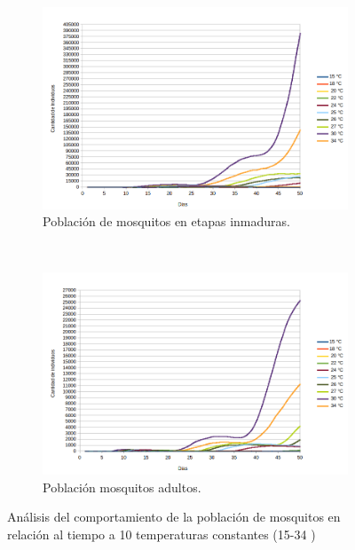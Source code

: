 \begin{figure}[!htpb]
    \centering
    \begin{subfigure}[b]{0.45\textwidth}
        \includegraphics[width=\textwidth]{./graphics/evolucion-poblacion-all.png}
        \caption{ Población de mosquitos en etapas inmaduras.}
    \end{subfigure}
    ~~~~
    \begin{subfigure}[b]{0.45\textwidth}
        \includegraphics[width=\textwidth]{./graphics/evolucion-poblacion-adultos.png}
        \caption{ Población mosquitos adultos.}
    \end{subfigure}

\caption{\label{fig:poblacion-all}Análisis del comportamiento de la población de mosquitos en relación al tiempo a 10 temperaturas constantes (15-34 \textcelsius)}
\end{figure}

